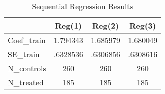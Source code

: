 \begin{table}[htbp]\centering
\caption{Sequential Regression Results}
\begin{tabular}{l*{3}{c}}
\hline\hline
            &      Reg(1)&      Reg(2)&      Reg(3)\\
\hline
Coef\_train  &    1.794343&    1.685979&    1.680049\\
SE\_train    &    .6328536&    .6306856&    .6308616\\
N\_controls  &         260&         260&         260\\
N\_treated   &         185&         185&         185\\
\hline\hline
\end{tabular}
\end{table}
